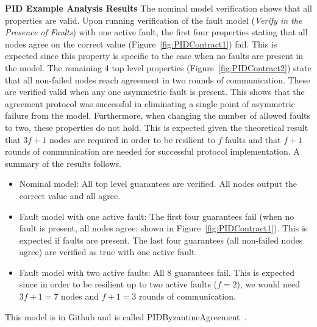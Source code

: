 \textbf{PID Example Analysis Results}
The nominal model verification shows that all properties are valid. Upon running verification of the fault model (\textit{Verify in the Presence of Faults}) with one active fault, the first four properties stating that all nodes agree on the correct value (Figure~\ref{fig:PIDContract1}) fail. This is expected since this property is specific to the case when no faults are present in the model. The remaining 4 top level properties (Figure~\ref{fig:PIDContract2}) state that all non-failed nodes reach agreement in two rounds of communication. These are verified valid when any one asymmetric fault is present. This shows that the agreement protocol was successful in eliminating a single point of asymmetric failure from the model. Furthermore, when changing the number of allowed faults to two, these properties do not hold. This is expected given the theoretical result that $3f+1$ nodes are required in order to be resilient to $f$ faults and that $f+1$ rounds of communication are needed for successful protocol implementation. %
A summary of the results follows. 
\begin{itemize}
	\item Nominal model: All top level guarantees are verified. All nodes output the correct value and all agree. 
	\item Fault model with one active fault: The first four guarantees fail (when no fault is present, all nodes agree: shown in Figure~\ref{fig:PIDContract1}). This is expected if faults are present. The last four guarantees (all non-failed nodes agree) are verified as true with one active fault. 
	\item Fault model with two active faults: All 8 guarantees fail. This is expected since in order to be resilient up to two active faults ($f=2$), we would need $3f + 1 = 7$ nodes and $f+1 = 3$ rounds of communication. 
\end{itemize}
This model is in Github and is called PIDByzantineAgreement~\cite{SAGithub}.
